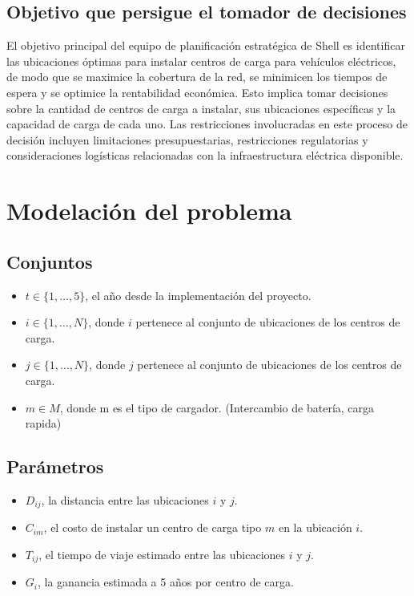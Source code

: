 \documentclass[letterpaper]{article}
\begin{document}
\begin{flushleft}
		\subsection{Objetivo que persigue el tomador de decisiones}
		El objetivo principal del equipo de planificación estratégica de Shell es identificar las ubicaciones óptimas para instalar centros de carga para vehículos eléctricos, de modo que se maximice la cobertura de la red, se minimicen los tiempos de espera y se optimice la rentabilidad económica. Esto implica tomar decisiones sobre la cantidad de centros de carga a instalar, sus ubicaciones específicas y la capacidad de carga de cada uno. Las restricciones involucradas en este proceso de decisión incluyen limitaciones presupuestarias, restricciones regulatorias y consideraciones logísticas relacionadas con la infraestructura eléctrica disponible. 
		
		\section{Modelación del problema}
		\subsection{Conjuntos}
		\begin{itemize}
			\item $t \in \{1, \ldots, 5\}$, el año desde la implementación del proyecto.
			\item $i \in \{1, \ldots, N\}$, donde $i$ pertenece al conjunto de ubicaciones de los centros de carga.
			\item $j \in \{1, \ldots, N\}$, donde $j$ pertenece al conjunto de ubicaciones de los centros de carga.
			\item $m \in M$, donde m es el tipo de cargador. (Intercambio de batería, carga rapida)
		\end{itemize}
		
		\subsection{Parámetros}
		\begin{itemize}
			\item $D_{ij}$, la distancia entre las ubicaciones $i$ y $j$.
			\item $C_{im}$, el costo de instalar un centro de carga tipo $m$ en la ubicación $i$.
			\item $T_{ij}$, el tiempo de viaje estimado entre las ubicaciones $i$ y $j$.
			\item $G_i$, la ganancia estimada a 5 años por centro de carga.
		\end{itemize}

\end{flushleft}
\end{document}
